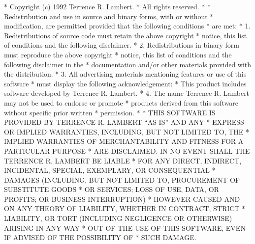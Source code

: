 \begin{copyrightEnv}
 * Copyright (c) 1992 Terrence R. Lambert.
 * All rights reserved.
 *
 * Redistribution and use in source and binary forms, with or without
 * modification, are permitted provided that the following conditions
 * are met:
 * 1. Redistributions of source code must retain the above copyright
 *    notice, this list of conditions and the following disclaimer.
 * 2. Redistributions in binary form must reproduce the above copyright
 *    notice, this list of conditions and the following disclaimer in the
 *    documentation and/or other materials provided with the distribution.
 * 3. All advertising materials mentioning features or use of this software
 *    must display the following acknowledgement:
 *      This product includes software developed by Terrence R. Lambert.
 * 4. The name Terrence R. Lambert may not be used to endorse or promote
 *    products derived from this software without specific prior written
 *    permission.
 *
 * THIS SOFTWARE IS PROVIDED BY TERRENCE R. LAMBERT ``AS IS'' AND ANY
 * EXPRESS OR IMPLIED WARRANTIES, INCLUDING, BUT NOT LIMITED TO, THE
 * IMPLIED WARRANTIES OF MERCHANTABILITY AND FITNESS FOR A PARTICULAR PURPOSE
 * ARE DISCLAIMED.  IN NO EVENT SHALL THE TERRENCE R. LAMBERT BE LIABLE
 * FOR ANY DIRECT, INDIRECT, INCIDENTAL, SPECIAL, EXEMPLARY, OR CONSEQUENTIAL
 * DAMAGES (INCLUDING, BUT NOT LIMITED TO, PROCUREMENT OF SUBSTITUTE GOODS
 * OR SERVICES; LOSS OF USE, DATA, OR PROFITS; OR BUSINESS INTERRUPTION)
 * HOWEVER CAUSED AND ON ANY THEORY OF LIABILITY, WHETHER IN CONTRACT, STRICT
 * LIABILITY, OR TORT (INCLUDING NEGLIGENCE OR OTHERWISE) ARISING IN ANY WAY
 * OUT OF THE USE OF THIS SOFTWARE, EVEN IF ADVISED OF THE POSSIBILITY OF
 * SUCH DAMAGE.
\end{copyrightEnv}

